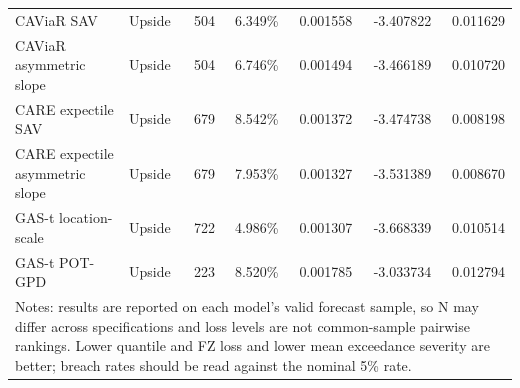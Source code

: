 \begin{tabular}{llrrrrr}
CAViaR SAV & Upside & 504 & 6.349\% & 0.001558 & -3.407822 & 0.011629 \\
CAViaR asymmetric slope & Upside & 504 & 6.746\% & 0.001494 & -3.466189 & 0.010720 \\
CARE expectile SAV & Upside & 679 & 8.542\% & 0.001372 & -3.474738 & 0.008198 \\
CARE expectile asymmetric slope & Upside & 679 & 7.953\% & 0.001327 & -3.531389 & 0.008670 \\
GAS-t location-scale & Upside & 722 & 4.986\% & 0.001307 & -3.668339 & 0.010514 \\
GAS-t POT-GPD & Upside & 223 & 8.520\% & 0.001785 & -3.033734 & 0.012794 \\
\midrule
\multicolumn{7}{p{0.96\linewidth}}{\footnotesize Notes: results are reported on each model's valid forecast sample, so N may differ across specifications and loss levels are not common-sample pairwise rankings. Lower quantile and FZ loss and lower mean exceedance severity are better; breach rates should be read against the nominal 5\% rate.} \\
\bottomrule
\end{tabular}
